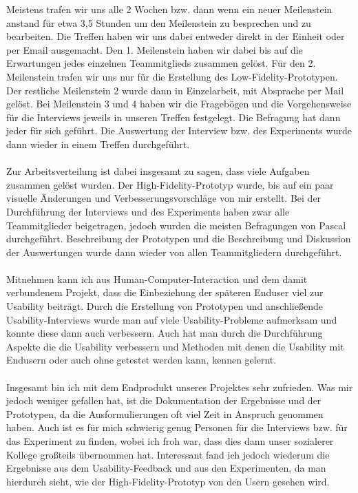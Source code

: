 \documentclass[a4paper,10pt]{scrartcl}
\begin{document}

Meistens trafen wir uns alle 2 Wochen bzw. dann wenn ein neuer Meilenstein anstand für etwa 3,5 Stunden um den Meilenstein zu besprechen und zu bearbeiten. Die Treffen haben wir uns
dabei entweder direkt in der Einheit oder per Email ausgemacht. Den 1. Meilenstein haben wir dabei bis auf die Erwartungen jedes einzelnen Teammitglieds zusammen gelöst.
Für den 2. Meilenstein trafen wir uns nur für die Erstellung des Low-Fidelity-Prototypen. Der restliche Meilenstein 2 wurde dann in Einzelarbeit, mit Absprache per Mail
gelöst. Bei Meilenstein 3 und 4 haben wir die Fragebögen und die Vorgehensweise für die Interviews
jeweils in unseren Treffen festgelegt. Die Befragung hat dann jeder für sich geführt. Die Auswertung der Interview bzw. des Experiments wurde dann wieder in einem Treffen
durchgeführt.
\\ \\
Zur Arbeitsverteilung ist dabei insgesamt zu sagen, dass viele Aufgaben zusammen gelöst wurden. Der High-Fidelity-Prototyp wurde, bis auf ein paar visuelle Änderungen
und Verbesserungsvorschläge von mir erstellt.
Bei der Durchführung der Interviews und des Experiments haben zwar alle Teammitglieder beigetragen, jedoch wurden die meisten Befragungen von Pascal durchgeführt. Beschreibung
der Prototypen und die Beschreibung und Diskussion der Auswertungen wurde dann wieder von allen Teammitgliedern durchgeführt.
\\ \\
Mitnehmen kann ich aus Human-Computer-Interaction und dem damit verbundenem Projekt, dass die Einbeziehung der späteren Enduser viel zur Usability beiträgt. Durch die Erstellung von Prototypen und anschließende Usability-Interviews wurde man auf viele Usability-Probleme aufmerksam und
konnte diese dann auch verbessern. Auch hat man durch die Durchführung Aspekte die die Usability verbessern und Methoden mit denen die Usability mit Endusern oder auch ohne
getestet werden kann, kennen gelernt.
\\ \\
Insgesamt bin ich mit dem Endprodukt unseres Projektes sehr zufrieden. Was mir jedoch weniger gefallen hat, ist die Dokumentation der Ergebnisse und der Prototypen, da
die Ausformulierungen oft viel Zeit in Anspruch genommen haben. Auch ist es für mich schwierig genug Personen für die Interviews bzw. für das Experiment zu finden, wobei
ich froh war, dass dies dann unser sozialerer Kollege großteils übernommen hat. Interessant fand ich jedoch wiederum die Ergebnisse aus dem Usability-Feedback und aus den Experimenten,
da man hierdurch sieht, wie der High-Fidelity-Prototyp von den Usern gesehen wird.
\end{document}

